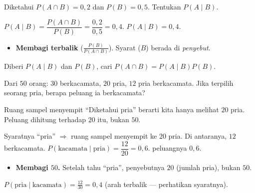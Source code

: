 \begin{soalbox}{}
Diketahui $P(A\cap B)=0{,}2$ dan $P(B)=0{,}5$. Tentukan $P(A\mid B)$.
\end{soalbox}

\jawab
{} $P(A\mid B)=\dfrac{P(A\cap B)}{P(B)}=\dfrac{0{,}2}{0{,}5}=0{,}4$.
\jadi $P(A\mid B)=0{,}4$.

\begin{jebakan}
\begin{itemize}[leftmargin=*,topsep=2pt]
  \item \textbf{Membagi terbalik} ($\frac{P(B)}{P(A\cap B)}$). Syarat ($B$)
  berada di \emph{penyebut}.
\end{itemize}
\end{jebakan}

\begin{variasi}
Diberi $P(A\mid B)$ dan $P(B)$, cari $P(A\cap B)=P(A\mid B)P(B)$.
\end{variasi}

\begin{soalbox}{}
Dari $50$ orang: $30$ berkacamata, $20$ pria, $12$ pria berkacamata. Jika
terpilih seorang pria, berapa peluang ia berkacamata?
\end{soalbox}

\begin{ingat}{Ruang sampel menyempit}
``Diketahui pria'' berarti kita hanya melihat $20$ pria. Peluang dihitung
terhadap $20$ itu, bukan $50$.
\end{ingat}

\jawab
{} Syaratnya ``pria'' $\Rightarrow$ ruang sampel menyempit ke $20$ pria.
 Di antaranya, $12$ berkacamata.
 $P(\text{kacamata}\mid\text{pria})=\dfrac{12}{20}=0{,}6$.
\jadi peluangnya $0{,}6$.

\begin{jebakan}
\begin{itemize}[leftmargin=*,topsep=2pt]
  \item \textbf{Membagi $50$.} Setelah tahu ``pria'', penyebutnya $20$ (jumlah
  pria), bukan $50$.
\end{itemize}
\end{jebakan}

\begin{variasi}
$P(\text{pria}\mid\text{kacamata})=\frac{12}{30}=0{,}4$ (arah terbalik ---
perhatikan syaratnya).
\end{variasi}

